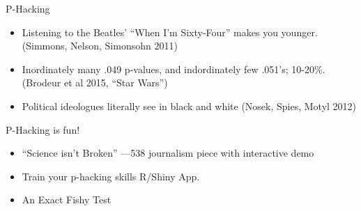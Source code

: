 \documentclass{beamer}
\begin{document}
{ \begin{frame}[plain]
     \end{frame}
}

\begin{frame}{P-Hacking}
\begin{itemize}

\item
Listening to the Beatles' ``When I'm Sixty-Four'' makes you younger. (Simmons, Nelson, Simonsohn 2011)
\item
Inordinately many .049 p-values, and indordinately few .051's; 10-20\%. (Brodeur et al 2015, ``Star Wars'')
\item 
Political ideologues literally see in black and white (Nosek, Spies, Motyl 2012)
\end{itemize}

\end{frame}

\begin{frame}{P-Hacking is fun!}
\begin{itemize}
\item
``Science isn't Broken'' ---538 journalism piece with interactive demo \href{http://fivethirtyeight.com/features/science-isnt-broken}{}
\item 
Train your p-hacking skills R/Shiny App. \href{http://www.nicebread.de/introducing-p-hacker/}{}
\item
An Exact Fishy Test \href{https://macartan.shinyapps.io/fish/}{}
\end{itemize}
\end{frame}
\end{document}
